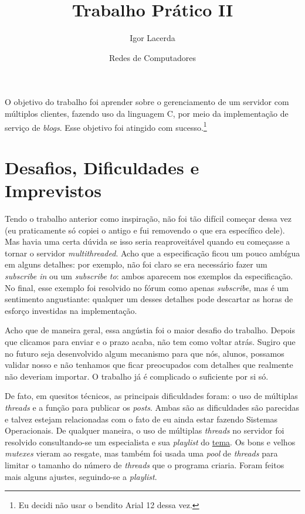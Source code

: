 \documentclass[12pt]{article}
\author{Igor Lacerda}
\title{Trabalho Prático II}
\date{Redes de Computadores}
\begin{document}
\maketitle

O objetivo do trabalho foi aprender sobre o gerenciamento de um servidor com múltiplos clientes, fazendo uso da linguagem C, por meio da implementação de serviço de \textit{blogs}. Esse objetivo foi atingido com sucesso.\footnote{Eu decidi não usar o bendito Arial 12 dessa vez.}

\section*{Desafios, Dificuldades e Imprevistos}

Tendo o trabalho anterior como inspiração, não foi tão difícil começar dessa vez (eu praticamente só copiei o antigo e fui removendo o que era específico dele). Mas havia uma certa dúvida se isso seria reaproveitável quando eu começasse a tornar o servidor \textit{multithreaded}. Acho que a especificação ficou um pouco ambígua em alguns detalhes: por exemplo, não foi claro se era necessário fazer um \textit{subscribe in} ou um \textit{subscribe to}: ambos aparecem nos exemplos da especificação. No final, esse exemplo foi resolvido no fórum como apenas \textit{subscribe}, mas é um sentimento angustiante: qualquer um desses detalhes pode descartar as horas de esforço investidas na implementação.

Acho que de maneira geral, essa angústia foi o maior desafio do trabalho. Depois que clicamos para enviar e o prazo acaba, não tem como voltar atrás. Sugiro que no futuro seja desenvolvido algum mecanismo para que nós, alunos, possamos validar nosso e não tenhamos que ficar preocupados com detalhes que realmente não deveriam importar. O trabalho já é complicado o suficiente por si só.

De fato, em quesitos técnicos, as principais dificuldades foram: o uso de múltiplas \textit{threads} e a função para publicar os \textit{posts}. Ambas são as dificuldades são parecidas e talvez estejam relacionadas com o fato de eu ainda estar fazendo Sistemas Operacionais. De qualquer maneira, o uso de múltiplas \textit{threads} no servidor foi resolvido consultando-se um especialista e sua \textit{playlist} do \href{https://www.youtube.com/watch?v=Pg_4Jz8ZIH4}{tema}. Os bons e velhos \textit{mutexes} vieram ao resgate, mas também foi usada uma \textit{pool} de \textit{threads} para limitar o tamanho do número de \textit{threads} que o programa criaria. Foram feitos mais alguns ajustes, seguindo-se a \textit{playlist}.
\end{document}
